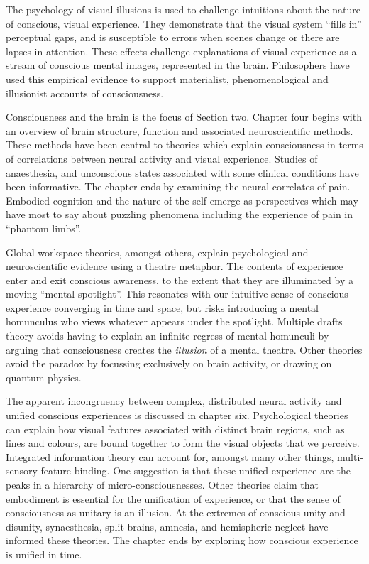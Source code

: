 \documentclass[a4paper]{article}
\begin{document}
The psychology of visual illusions is used to challenge intuitions about the
nature of conscious, visual experience. They demonstrate that the visual
system ``fills in'' perceptual gaps, and is susceptible to errors when scenes
change or there are lapses in attention. These effects challenge explanations
of visual experience as a stream of conscious mental images, represented in
the brain. Philosophers have used this empirical evidence to support
materialist, phenomenological and illusionist accounts of consciousness.

Consciousness and the brain is the focus of Section two. Chapter four begins
with an overview of brain structure, function and associated neuroscientific
methods. These methods have been central to theories which explain
consciousness in terms of correlations between neural activity and visual
experience. Studies of anaesthesia, and unconscious states associated with
some clinical conditions have been informative. The chapter ends by examining
the neural correlates of pain. Embodied cognition and the nature of the self
emerge as perspectives which may have most to say about puzzling phenomena
including the experience of pain in ``phantom limbs''.

Global workspace theories, amongst others, explain psychological and
neuroscientific evidence using a theatre metaphor. The contents of experience
enter and exit conscious awareness, to the extent that they are illuminated by
a moving ``mental spotlight''. This resonates with our intuitive sense of
conscious experience converging in time and space, but risks introducing a
mental homunculus who views whatever appears under the spotlight. Multiple
drafts theory avoids having to explain an infinite regress of mental homunculi
by arguing that consciousness creates the \textit{illusion} of a mental
theatre. Other theories avoid the paradox by focussing exclusively on brain
activity, or drawing on quantum physics.

The apparent incongruency between complex, distributed neural activity and
unified conscious experiences is discussed in chapter six. Psychological
theories can explain how visual features associated with distinct brain
regions, such as lines and colours, are bound together to form the visual
objects that we perceive. Integrated information theory can account for,
amongst many other things, multi-sensory feature binding. One suggestion is
that these unified experience are the peaks in a hierarchy of
micro-consciousnesses. Other theories claim that embodiment is essential for
the unification of experience, or that the sense of consciousness as unitary
is an illusion. At the extremes of conscious unity and disunity, synaesthesia,
split brains, amnesia, and hemispheric neglect have informed these theories.
The chapter ends by exploring how conscious experience is unified in time.
\end{document}
